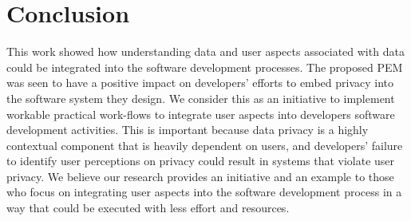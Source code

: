 \documentclass{sigchi}
\begin{document}
\section {Conclusion}

This work showed how understanding data and user aspects associated with data could be integrated into the software development processes. The proposed PEM was seen to have a positive impact on developers' efforts to embed privacy into the software system they design. We consider this as an initiative to implement workable practical work-flows to integrate user aspects into developers software development activities. This is important because data privacy is a highly contextual component that is heavily dependent on users, and developers' failure to identify user perceptions on privacy could result in systems that violate user privacy. We believe our research provides an initiative and an example to those who focus on integrating user aspects into the software development process in a way that could be executed with less effort and resources.




\balance{}



\end{document}

